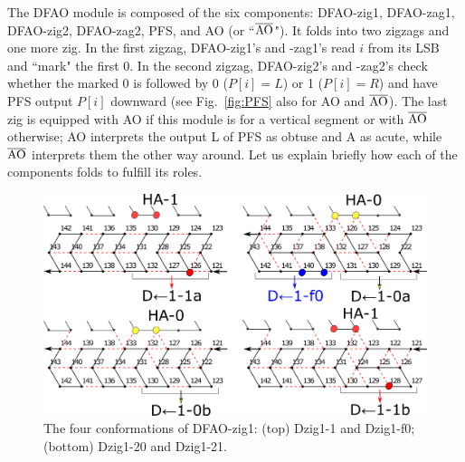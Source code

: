 The DFAO module is composed of the six components: DFAO-zig1, DFAO-zag1, DFAO-zig2, DFAO-zag2, PFS, and AO (or  ``$\overline{\rm AO}$").
It folds into two zigzags and one more zig.
In the first zigzag, DFAO-zig1's and -zag1's read $i$ from its LSB and ``mark" the first 0. 
In the second zigzag, DFAO-zig2's and -zag2's check whether the marked 0 is followed by 0 ($P[i] = L$) or 1 ($P[i] = R$) and have PFS output $P[i]$ downward (see Fig.~\ref{fig:PFS} also for AO and $\overline{\rm AO}$). 
The last zig is equipped with AO if this module is for a vertical segment or with $\overline{\rm AO}$ otherwise; AO interprets the output L of PFS as obtuse and A as acute, while $\overline{\rm AO}$ interprets them the other way around. 
Let us explain briefly how each of the components folds to fulfill its roles.

\begin{figure}
\vspace*{-5mm}
\centering
\includegraphics[width=\linewidth]{pic/DFAO-zig1.png}  
\caption{The four conformations of DFAO-zig1: (top) Dzig1-1 and Dzig1-f0; (bottom) Dzig1-20 and Dzig1-21.}
\label{fig:DFAO-zig1}
\vspace*{-3mm}
\end{figure}

